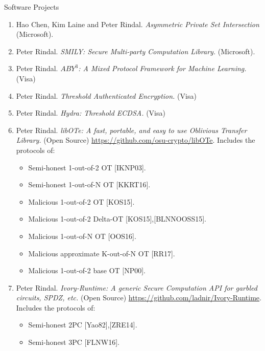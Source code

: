 \documentclass{resume} %
\begin{document}
\begin{rSection}{Software Projects}
	
	
	\begin{enumerate}[label=S\arabic* --]
		
		\item Hao Chen, Kim Laine and Peter Rindal. \emph{Asymmetric Private Set Intersection} (Microsoft).
		
		\item Peter Rindal. \emph{SMILY: Secure Multi-party Computation Library.} (Microsoft).
		
		\item  Peter Rindal. \emph{$ABY^3$: A Mixed Protocol Framework for Machine Learning.}  (Visa)
		
		
		\item Peter Rindal. \emph{Threshold Authenticated Encryption.} (Visa)
		
		\item Peter Rindal. \emph{Hydra: Threshold ECDSA.} (Visa)
		
		\item Peter Rindal. \emph{libOTe: A fast, portable, and easy to use Oblivious Transfer Library.}  (Open Source) \url{https://github.com/osu-crypto/libOTe}. Includes the protocols of:
		\begin{itemize}
			\item Semi-honest 1-out-of-2 OT [IKNP03]. 
			\item Semi-honest 1-out-of-N OT [KKRT16].
			\item Malicious 1-out-of-2 OT [KOS15].
			\item Malicious 1-out-of-2 Delta-OT [KOS15],[BLNNOOSS15].
			\item Malicious 1-out-of-N OT [OOS16].
			\item Malicious approximate K-out-of-N OT [RR17].
			\item Malicious 1-out-of-2 base OT [NP00].
		\end{itemize}
		\item Peter Rindal. \emph{Ivory-Runtime: A generic Secure Computation API for garbled circuits, SPDZ, etc.} (Open Source)  \url{https://github.com/ladnir/Ivory-Runtime}. Includes the protocols of:
		\begin{itemize}
			\item Semi-honest 2PC [Yao82],[ZRE14].
			\item Semi-honest 3PC [FLNW16].
		\end{itemize}
		

\end{enumerate}
\end{rSection}
\end{document}
